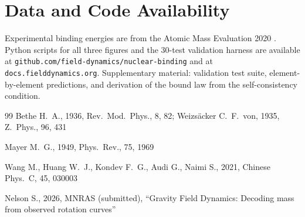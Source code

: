 \documentclass[fleqn,usenatbib]{mnras}
\begin{document}
\section{Data and Code Availability}
\label{sec:data}
Experimental binding energies are from the Atomic Mass Evaluation 2020 \citep{AME2020}. Python scripts for all three figures and the 30-test validation harness are available at \texttt{github.com/field-dynamics/nuclear-binding} and at \texttt{docs.fielddynamics.org}. Supplementary material: validation test suite, element-by-element predictions, and derivation of the bound law from the self-consistency condition.



\begin{thebibliography}{99}
Bethe H.~A., 1936, Rev.\ Mod.\ Phys., 8, 82; Weizs\"acker C.~F.~von, 1935, Z.\ Phys., 96, 431

Mayer M.~G., 1949, Phys.\ Rev., 75, 1969

Wang M., Huang W.~J., Kondev F.~G., Audi G., Naimi S., 2021, Chinese Phys.\ C, 45, 030003

Nelson S., 2026, MNRAS (submitted), ``Gravity Field Dynamics: Decoding mass from observed rotation curves''
\end{thebibliography}
\end{document}
